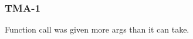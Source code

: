 \subsubsection{TMA-1}\label{sec:error_code_tma_1}

Function call was given more args than it can take.


